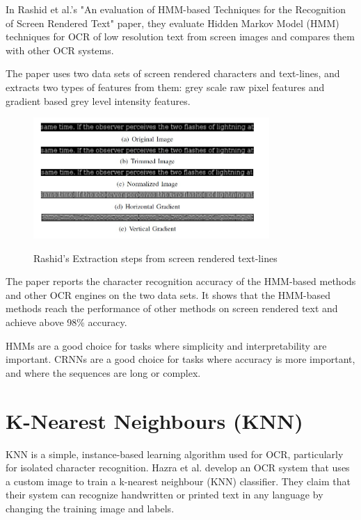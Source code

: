 In Rashid et al.'s "An evaluation of HMM-based Techniques for the Recognition of Screen Rendered Text" paper, they evaluate Hidden Markov Model (HMM) techniques for OCR of low resolution text from screen images and compares them with other OCR systems.

The paper uses two data sets of screen rendered characters and text-lines, and extracts two types of features from them: grey scale raw pixel features and gradient based grey level intensity features.


\begin{figure}[!h]
    \centering
    \includegraphics[width=0.8\textwidth]{Figures/HMM_Rashid.jpg}
    \caption[Rashid's Extraction steps from screen rendered text-lines]{Rashid's Extraction steps from screen rendered text-lines}\cite{rashidEvaluationHMMBasedTechniques2011}
    \label{fig:Rashid Feature Extraction Steps}
\end{figure}

The paper reports the character recognition accuracy of the HMM-based methods and other OCR engines on the two data sets. It shows that the HMM-based methods reach the performance of other methods on screen rendered text and achieve above 98\% accuracy.\cite{rashidEvaluationHMMBasedTechniques2011}

HMMs are a good choice for tasks where simplicity and interpretability are important. CRNNs are a good choice for tasks where accuracy is more important, and where the sequences are long or complex.

\newpage

\section{K-Nearest Neighbours (KNN)}

KNN is a simple, instance-based learning algorithm used for OCR, particularly for isolated character recognition. Hazra et al. develop an OCR system that uses a custom image to train a k-nearest neighbour (KNN) classifier. They claim that their system can recognize handwritten or printed text in any language by changing the training image and labels. \cite{hazraOpticalCharacterRecognition2017}

